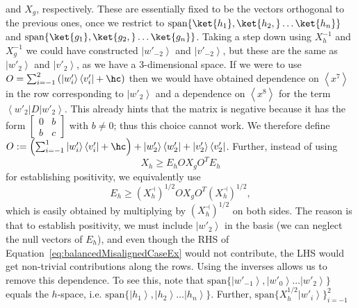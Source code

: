 \documentclass{theoretics}
\begin{document}
and $X_{g}$, respectively. These are essentially fixed to be the vectors orthogonal to the previous ones, once we restrict to $\text{span}\{\ket{h_1},\ket{h_2,}\ldots\ket{h_n}\}$ and $\text{span}\{\ket{g_1},\ket{g_2,}\ldots\ket{g_n}\}$.  Taking a step down using $X_{h}^{-1}$ and $X_{g}^{-1}$ we could
have constructed $\left|w'_{-2}\right\rangle $ and $\left|v'_{-2}\right\rangle $, but these are the same as $\left|w'_{2}\right\rangle $
and $\left|v'_{2}\right\rangle$, as we have a 3-dimensional space. If
we were to use $O=\sum_{i=-1}^{2}\left(\left|w'_{i}\right\rangle \left\langle v'_{i}\right|+\hc\right)$
then we would have obtained dependence on $\left\langle x^{7}\right\rangle $
in the row corresponding to $\left|w'_{2}\right\rangle $ and
a dependence on $\left\langle x^{8}\right\rangle $ for the term
$\left\langle w'_{2}\right|D\left|w'_{2}\right\rangle $. This
already hints that the matrix is negative because it has the form
$\left[\begin{array}{cc}
      0 & b \\
      b & c
    \end{array}\right]$ with $b\neq0$; thus this choice cannot work. We therefore
define $O:=\left(\sum_{i=-1}^{1}\left|w'_{i}\right\rangle \left\langle v'_{i}\right|+\hc\right)+\left|w'_{2}\right\rangle \left\langle w'_{2}\right|+\left|v'_{2}\right\rangle \left\langle v'_{2}\right|$. Further, instead of using
\begin{equation}
  X_{h}\ge E_{h}OX_{g}O^{T}E_{h}\label{eq:balancedMisalignedCaseEx}
\end{equation}
for establishing positivity, we equivalently use
\begin{equation}
  E_{h}\ge\left(X_{h}^{\dashv}\right)^{1/2}OX_{g}O^{T}\left(X_{h}^{\dashv}\right)^{1/2},\label{eq:balancedMisalignedInvertedEx}
\end{equation}
which is easily obtained by multiplying by $(X_{h}^{\dashv})^{1/2}$
on both sides. The reason is that to establish positivity, we
must include $\left|w'_{2}\right\rangle $ in the basis (we can neglect
the null vectors of $E_{h}$), and even though the RHS of Equation~\eqref{eq:balancedMisalignedCaseEx}
would not contribute, the LHS would get non-trivial contributions
along the rows. Using the
inverses allows us to remove this dependence. To see this, note that $\text{span}\{\left|w'_{-1}\right\rangle ,\left|w'_{0}\right\rangle \dots\left|w'_{2}\right\rangle \}$
equals the $h$-space, i.e. $\text{span}\{\left|h_{1}\right\rangle ,\left|h_{2}\right\rangle \dots\left|h_{n}\right\rangle \}$.
Further, $\text{span}\{X_{h}^{1/2}\left|w'_{i}\right\rangle \}_{i=-1}^{2}$
\end{document}
